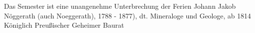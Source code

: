 {Das Semester ist eine unangenehme Unterbrechung der Ferien}
{Johann Jakob Nöggerath (auch Noeggerath), 1788 - 1877), dt. Mineraloge und Geologe, ab 1814 Königlich Preußischer Geheimer Baurat}





\vspace{3mm}
\vspace{3mm}
\newpage




